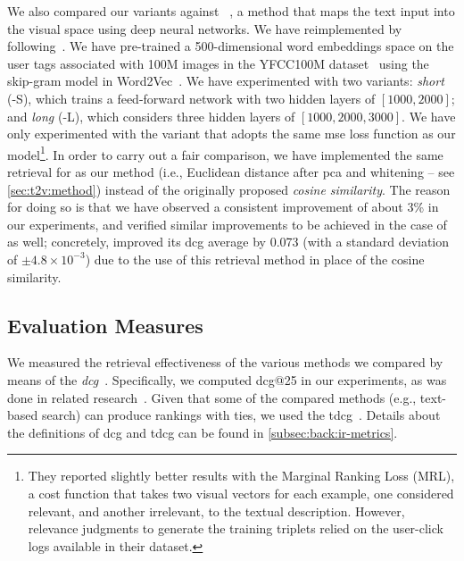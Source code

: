 We also compared our \ttv{} variants against \wordvisual{}~\cite{dong2018predicting}, a method that maps the text input into the visual space using deep neural networks.
We have reimplemented \wordvisual{} by following~\cite{dong2018predicting}.
We have pre-trained a 500-dimensional word embeddings space on the user tags associated with 100M images in the YFCC100M dataset~\cite{thomee2016yfcc100m} using the skip-gram model in Word2Vec~\cite{mikolov2013distributed}.
We have experimented with two variants: \emph{short} (\wordvisual{}-S), which trains a feed-forward network with two hidden layers of $[1000, 2000]$; and \emph{long} (\wordvisual{}-L), which considers three hidden layers of $[1000, 2000, 3000]$.
We have only experimented with the variant that adopts the same \gls{mse} loss function as our model\footnote{They reported slightly better results with the Marginal Ranking Loss (MRL), a cost function that takes two visual vectors for each example, one considered relevant, and another irrelevant, to the textual description. However, relevance judgments to generate the training triplets relied on the user-click logs available in their dataset.}. %
In order to carry out a fair comparison, we have implemented the same retrieval for \wordvisual{} as our method (i.e.,  Euclidean distance after \gls{pca} and whitening -- see \ref{sec:t2v:method}) instead of the originally proposed \emph{cosine similarity}.
The reason for doing so is that we have observed a consistent improvement of about 3\% in our experiments, and verified similar improvements to be achieved in the case of \wordvisual{} as well;
concretely, \wordvisual{} improved its \gls{dcg} average by 0.073 (with a standard deviation of $\pm 4.8 \times 10^{-3}$) due to the use of this retrieval method in place of the cosine similarity.

\subsection{Evaluation Measures}
\label{subsec:t2v:eval}

We measured the retrieval effectiveness of the various methods we compared by means of the \emph{\acrfull{dcg}}~\cite{jarvelin2002cumulated}.
%
%
Specifically, we computed \gls{dcg}@25 in our experiments, as was done in related research~\cite{hua2013clickage,dong2018predicting}.
Given that some of the compared methods (e.g., text-based search) can produce rankings with ties, we used the \gls{tdcg}~\cite{mcsherry2008computing}.
Details about the definitions of \gls{dcg} and \gls{tdcg} can be found in \ref{subsec:back:ir-metrics}.

